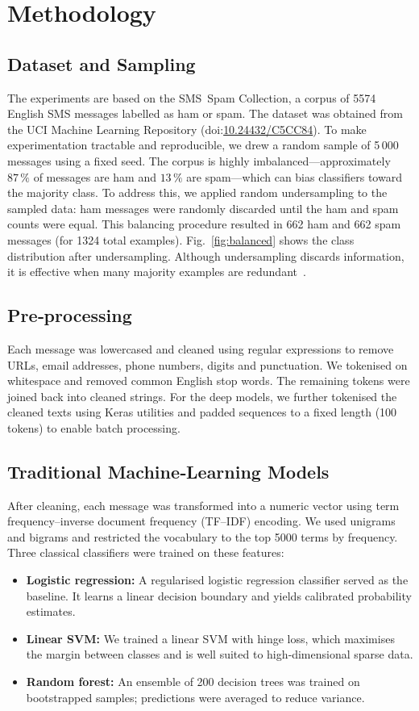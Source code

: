 \documentclass[conference]{IEEEtran}
\begin{document}
\section{Methodology}

\subsection{Dataset and Sampling}
The experiments are based on the SMS~Spam Collection, a corpus of 5574 English SMS messages labelled as ham or spam. The dataset was obtained from the UCI Machine Learning Repository (doi:\href{https://doi.org/10.24432/C5CC84}{10.24432/C5CC84}). To make experimentation tractable and reproducible, we drew a random sample of 5\,000 messages using a fixed seed. The corpus is highly imbalanced---approximately $87\,\%$ of messages are ham and $13\,\%$ are spam---which can bias classifiers toward the majority class. To address this, we applied random undersampling to the sampled data: ham messages were randomly discarded until the ham and spam counts were equal. This balancing procedure resulted in 662 ham and 662 spam messages (for 1324 total examples). Fig.~\ref{fig:balanced} shows the class distribution after undersampling. Although undersampling discards information, it is effective when many majority examples are redundant~\cite{he2009}.

\subsection{Pre‑processing}
Each message was lowercased and cleaned using regular expressions to remove URLs, email addresses, phone numbers, digits and punctuation.  We tokenised on whitespace and removed common English stop words.  The remaining tokens were joined back into cleaned strings.  For the deep models, we further tokenised the cleaned texts using Keras utilities and padded sequences to a fixed length (100 tokens) to enable batch processing.

\subsection{Traditional Machine‑Learning Models}

After cleaning, each message was transformed into a numeric vector using term frequency–inverse document frequency (TF–IDF) encoding.  We used unigrams and bigrams and restricted the vocabulary to the top 5000 terms by frequency.  Three classical classifiers were trained on these features:
\begin{itemize}
  \item \textbf{Logistic regression:} A regularised logistic regression classifier served as the baseline.  It learns a linear decision boundary and yields calibrated probability estimates.
  \item \textbf{Linear SVM:} We trained a linear SVM with hinge loss, which maximises the margin between classes and is well suited to high‑dimensional sparse data.
  \item \textbf{Random forest:} An ensemble of 200 decision trees was trained on bootstrapped samples; predictions were averaged to reduce variance.
\end{itemize}
\end{document}
